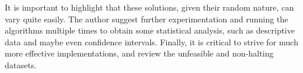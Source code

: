 \documentclass[10pt,twoside]{article}
\begin{document}
It is important to highlight that these solutions, given their random nature, can vary quite easily. The author suggest further experimentation and running the algorithms multiple times to obtain some statistical analysis, such as descriptive data and maybe even confidence intervals. Finally, it is critical to strive for much more effective implementations, and review the unfeasible and non-halting datasets.


{\small


}
\end{document}
